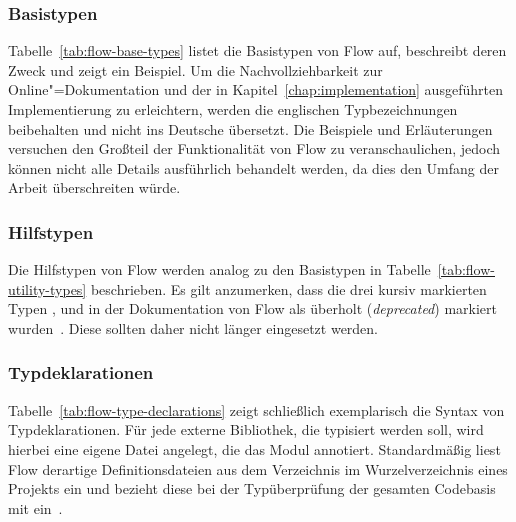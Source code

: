 \subsubsection{Basistypen}
\label{sec:flow:base-types}

Tabelle~\ref{tab:flow-base-types} listet die Basistypen von Flow auf, beschreibt deren Zweck und zeigt ein Beispiel. Um die Nachvollziehbarkeit zur Online"=Dokumentation und der in Kapitel~\ref{chap:implementation} ausgeführten Implementierung zu erleichtern, werden die englischen Typbezeichnungen beibehalten und nicht ins Deutsche übersetzt. Die Beispiele und Erläuterungen versuchen den Großteil der Funktionalität von Flow zu veranschaulichen, jedoch können nicht alle Details ausführlich behandelt werden, da dies den Umfang der Arbeit überschreiten würde.

\tablespace


\subsubsection{Hilfstypen}
\label{sec:flow:utility-types}

Die Hilfstypen von Flow werden analog zu den Basistypen in Tabelle~\ref{tab:flow-utility-types} beschrieben. Es gilt anzumerken, dass die drei kursiv markierten Typen ,  und  in der Dokumentation von Flow als überholt (\textit{deprecated}) markiert wurden~\autocite{FLOW:UTILITY_TYPES}. Diese sollten daher nicht länger eingesetzt werden.

\tablespace


\subsubsection{Typdeklarationen}
\label{sec:type-declarations}

Tabelle~\ref{tab:flow-type-declarations} zeigt schließlich exemplarisch die Syntax von Typdeklarationen. Für jede externe Bibliothek, die typisiert werden soll, wird hierbei eine eigene Datei angelegt, die das Modul annotiert. Standardmäßig liest Flow derartige Definitionsdateien aus dem Verzeichnis  im Wurzelverzeichnis eines Projekts ein und bezieht diese bei der Typüberprüfung der gesamten Codebasis mit ein~\autocite{FLOW:LIBRARY_DEFINITIONS}.

\tablespace


